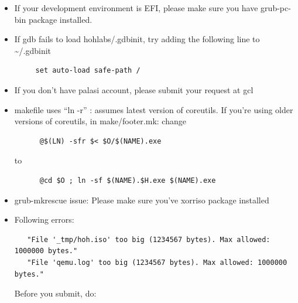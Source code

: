 \documentclass[]{book}
\newenvironment{Shaded}{}{}
\newcommand{\KeywordTok}[1]{\textbf{{#1}}}
\newcommand{\NormalTok}[1]{{#1}}
\begin{document}
\begin{itemize}
\item
  If your development environment is EFI, please make sure you have
  grub-pc-bin package installed.

\begin{Shaded}
\end{Shaded}
\item
  If gdb fails to load hohlabs/.gdbinit, try adding the following line
  to \textasciitilde{}/.gdbinit

\begin{verbatim}
     set auto-load safe-path /
\end{verbatim}
\item
  If you don't have palasi account, please submit your request at gcl
\item
  makefile uses ``ln -r'' : assumes latest version of coreutils. If
  you're using older versions of coreutils, in make/footer.mk: change

\begin{verbatim}
      @$(LN) -sfr $< $O/$(NAME).exe
\end{verbatim}

  to

\begin{verbatim}
      @cd $O ; ln -sf $(NAME).$H.exe $(NAME).exe
\end{verbatim}
\item
  grub-mkrescue issue: Please make sure you've xorriso package installed
\item
  Following errors:

\begin{verbatim}
   "File '_tmp/hoh.iso' too big (1234567 bytes). Max allowed: 1000000 bytes."
   "File 'qemu.log' too big (1234567 bytes). Max allowed: 1000000 bytes."
\end{verbatim}

  Before you submit, do:

\begin{Shaded}
\end{Shaded}
\end{itemize}
\end{document}
